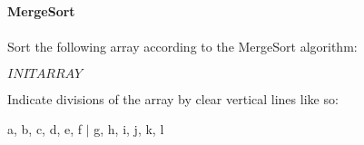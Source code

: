 \documentclass[12pt]{article}
\begin{document}
    \textbf{\LARGE{\color{tumgadRed} MergeSort}}\\
    \\
    \noindent
    Sort the following array according to the MergeSort algorithm:
    \begin{center}
        $INITARRAY$
    \end{center}
    Indicate divisions of the array by clear vertical lines like so:
    \noindent
    \begin{center}
        a, b, c, d, e, f $|$ g, h, i, j, k, l\\
        \vspace{10px}
    \end{center}
    \noindent{}
\end{document}
